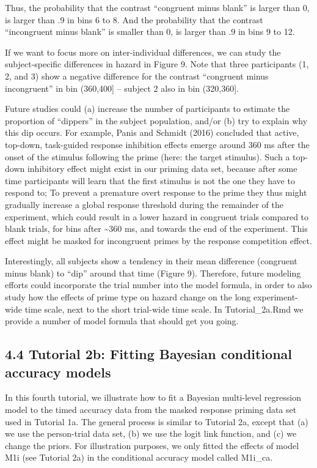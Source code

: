 \documentclass[
  man, donotrepeattitle,floatsintext]{apa6}
\begin{document}
Thus, the probability that the contrast ``congruent minus blank'' is larger than 0, is larger than .9 in bins 6 to 8. And the probability that the contrast ``incongruent minus blank'' is smaller than 0, is larger than .9 in bins 9 to 12.

If we want to focus more on inter-individual differences, we can study the subject-specific differences in hazard in Figure 9. Note that three participants (1, 2, and 3) show a negative difference for the contrast ``congruent minus incongruent'' in bin (360,400{]} -- subject 2 also in bin (320,360{]}.

Future studies could (a) increase the number of participants to estimate the proportion of ``dippers'' in the subject population, and/or (b) try to explain why this dip occurs. For example, Panis and Schmidt (2016) concluded that active, top-down, task-guided response inhibition effects emerge around 360 ms after the onset of the stimulus following the prime (here: the target stimulus). Such a top-down inhibitory effect might exist in our priming data set, because after some time participants will learn that the first stimulus is not the one they have to respond to; To prevent a premature overt response to the prime they thus might gradually increase a global response threshold during the remainder of the experiment, which could result in a lower hazard in congruent trials compared to blank trials, for bins after \textasciitilde360 ms, and towards the end of the experiment. This effect might be masked for incongruent primes by the response competition effect.

Interestingly, all subjects show a tendency in their mean difference (congruent minus blank) to ``dip'' around that time (Figure 9). Therefore, future modeling efforts could incorporate the trial number into the model formula, in order to also study how the effects of prime type on hazard change on the long experiment-wide time scale, next to the short trial-wide time scale. In Tutorial\_2a.Rmd we provide a number of model formula that should get you going.

\subsection{4.4 Tutorial 2b: Fitting Bayesian conditional accuracy models}\label{tutorial-2b-fitting-bayesian-conditional-accuracy-models}

In this fourth tutorial, we illustrate how to fit a Bayesian multi-level regression model to the timed accuracy data from the masked response priming data set used in Tutorial 1a. The general process is similar to Tutorial 2a, except that (a) we use the person-trial data set, (b) we use the logit link function, and (c) we change the priors. For illustration purposes, we only fitted the effects of model M1i (see Tutorial 2a) in the conditional accuracy model called M1i\_ca.
\end{document}
